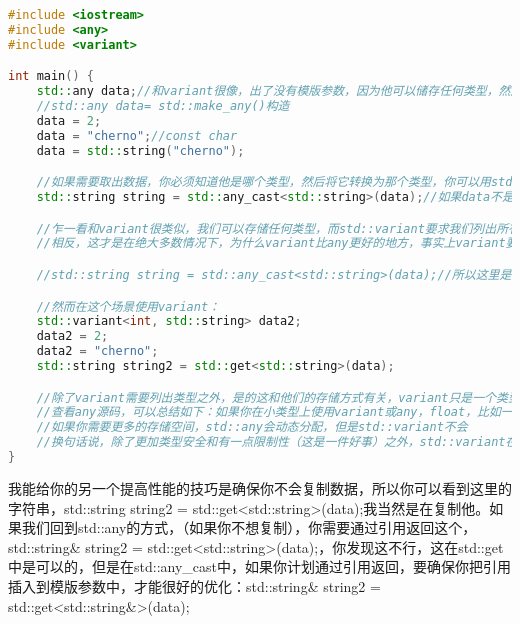 \begin{lstlisting}[language=c++]
#include <iostream>
#include <any>
#include <variant>

int main() {
    std::any data;//和variant很像，出了没有模版参数，因为他可以储存任何类型，然后输入变量名称data
    //std::any data= std::make_any()构造
    data = 2;
    data = "cherno";//const char
    data = std::string("cherno");

    //如果需要取出数据，你必须知道他是哪个类型，然后将它转换为那个类型，你可以用std::any_cast来做
    std::string string = std::any_cast<std::string>(data);//如果data不是你想转换的类型，这将会抛出一个类型转换异常，记住这一点

    //乍一看和variant很类似，我们可以存储任何类型，而std::variant要求我们列出所有类型，虽然很多人认为variant更糟糕，因为必须列出所有类型，而在any这里你根本不用担心类型
    //相反，这才是在绝大多数情况下，为什么variant比any更好的地方，事实上variant要求列出所有这些类型，这是很好的，会使得类型安全

    //std::string string = std::any_cast<std::string>(data);//所以这里是行不通的，cherno不是字符串，只是一个const char指针

    //然而在这个场景使用variant：
    std::variant<int, std::string> data2;
    data2 = 2;
    data2 = "cherno";
    std::string string2 = std::get<std::string>(data);

    //除了variant需要列出类型之外，是的这和他们的存储方式有关，variant只是一个类型安全的union，意思是他把所有的数据都存储在一个union里
    //查看any源码，可以总结如下：如果你在小类型上使用variant或any，float，比如一个类的vector或类似的东西，比如math库等，都没问题，我的意思是他们会以完全相同的方式工作
    //如果你需要更多的存储空间，std::any会动态分配，但是std::variant不会
    //换句话说，除了更加类型安全和有一点限制性（这是一件好事）之外，std::variant在处理较大数据时也执行的更快，而这些数据又需要避免动态内存分配
}
\end{lstlisting}

我能给你的另一个提高性能的技巧是确保你不会复制数据，所以你可以看到这里的字符串，{\ncodestyle std::string string2 = std::get<std::string>(data);}我当然是在复制他。如果我们回到{\ncodestyle std::any}的方式，（如果你不想复制），你需要通过引用返回这个，{\ncodestyle std::string\& string2 = std::get<std::string>(data);}，你发现这不行，这在{\ncodestyle std::get}中是可以的，但是在{\ncodestyle std::any_cast}中，如果你计划通过引用返回，要确保你把引用插入到模版参数中，才能很好的优化：{\ncodestyle std::string\& string2 = std::get<std::string\&>(data);}

